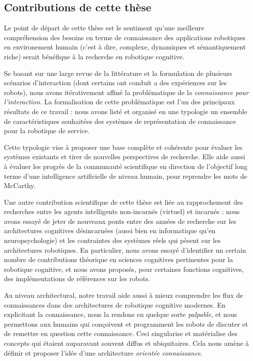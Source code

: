 
\subsection{Contributions de cette thèse}
\label{sect|contributions}

Le point de départ de cette thèse est le sentiment qu'une meilleure
compréhension des besoins en terme de connaissance des applications robotiques
en environement humain (c'est à dire, complexe, dynamiques et sémantiquement
riche) serait bénéfique à la recherche en robotique cognitive.

Se basant sur une large revue de la littérature et la formulation de plusieurs
scénarios d'interaction (dont certains ont conduit a des expériences sur les
robots), nous avons itérativement affiné la problématique de la
\emph{connaissance pour l'interaction}. La formalisation de cette problématique
est l'un des principaux résultats de ce travail : nous avons listé et organisé
en une typologie un ensemble de caractéristiques souhaitées des systèmes de
représentation de connaissance pour la robotique de service.

Cette typologie vise à proposer une base complète et cohérente pour évaluer les
systèmes existants et tirer de nouvelles perspectives de recherche. Elle aide
aussi à évaluer les progrès de la communauté scientifique en direction de
l'objectif long terme d'une intelligence artificielle de niveau humain, pour
reprendre les mots de McCarthy.

Une autre contribution scientifique de cette thèse est liée au rapprochement
des recherches entre les agents intelligents non-incarnés (virtuel) et incarnés
: nous avons essayé de jeter de nouveaux ponts entre des années de recherche
sur les architectures cognitives désincarnées (aussi bien en informatique qu'en
neuropsychologie) et les contraintes des systèmes réels qui pèsent sur les
architectures robotiques. En particulier, nous avons essayé d'identifier un
certain nombre de contributions théorique en sciences cognitives pertinentes
pour la robotique cognitive, et nous avons proposés, pour certaines fonctions
cognitives, des implémentations de références sur les robots.

Au niveau architectural, notre travail aide aussi à mieux comprendre les flux
de connaissances dans des architectures de robotique cognitive modernes. En
explicitant la connaissance, nous la rendons en quelque sorte \emph{palpable},
et nous permettons aux humains qui conçoivent et programment les robots de
discuter et de remettre en question cette connaissance. Ceci singularise et
matérialise des concepts qui étaient auparavant souvent diffus et ubiquitaires.
Cela nous amène à définir et proposer l'idée d'une architecture \emph{orientée
connaissance}.





